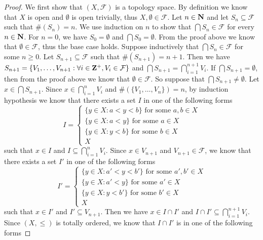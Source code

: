 \begin{proof}
  We first show that \((X, \mathcal{F})\) is a topology space.
  By definition we know that \(X\) is open and \(\emptyset\) is open trivially, thus \(X, \emptyset \in \mathcal{F}\).
  Let \(n \in \mathbf{N}\) and let \(S_n \subseteq \mathcal{F}\) such that \(\#(S_n) = n\).
  We use induction on \(n\) to show that \(\bigcap S_n \in \mathcal{F}\) for every \(n \in \mathbf{N}\).
  For \(n = 0\), we have \(S_0 = \emptyset\) and \(\bigcap S_0 = \emptyset\).
  From the proof above we know that \(\emptyset \in \mathcal{F}\), thus the base case holds.
  Suppose inductively that \(\bigcap S_n \in \mathcal{F}\) for some \(n \geq 0\).
  Let \(S_{n + 1} \subseteq \mathcal{F}\) such that \(\#(S_{n + 1}) = n + 1\).
  Then we have \(S_{n + 1} = \{V_1, \dots, V_{n + 1} : \forall i \in \mathbf{Z}^+, V_i \in \mathcal{F}\}\) and \(\bigcap S_{n + 1} = \bigcap_{i = 1}^{n + 1} V_i\).
  If \(\bigcap S_{n + 1} = \emptyset\), then from the proof above we know that \(\emptyset \in \mathcal{F}\).
  So suppose that \(\bigcap S_{n + 1} \neq \emptyset\).
  Let \(x \in \bigcap S_{n + 1}\).
  Since \(x \in \bigcap_{i = 1}^n V_i\) and \(\#(\{V_1, \dots, V_n\}) = n\), by induction hypothesis we know that there exists a set \(I\) in one of the following forms
  \[
    I = \begin{cases}
      \{y \in X : a < y < b\} \text{ for some } a, b \in X \\
      \{y \in X : a < y\} \text{ for some } a \in X        \\
      \{y \in X : y < b\} \text{ for some } b \in X        \\
      X
    \end{cases}
  \]
  such that \(x \in I\) and \(I \subseteq \bigcap_{i = 1}^n V_i\).
  Since \(x \in V_{n + 1}\) and \(V_{n + 1} \in \mathcal{F}\), we know that there exists a set \(I'\) in one of the following forms
  \[
    I' = \begin{cases}
      \{y \in X : a' < y < b'\} \text{ for some } a', b' \in X \\
      \{y \in X : a' < y\} \text{ for some } a' \in X          \\
      \{y \in X : y < b'\} \text{ for some } b' \in X          \\
      X
    \end{cases}
  \]
  such that \(x \in I'\) and \(I' \subseteq V_{n + 1}\).
  Then we have \(x \in I \cap I'\) and \(I \cap I' \subseteq \bigcap_{i = 1}^{n + 1} V_i\).
  Since \((X, \leq)\) is totally ordered, we know that \(I \cap I'\) is in one of the following forms

\end{proof}
